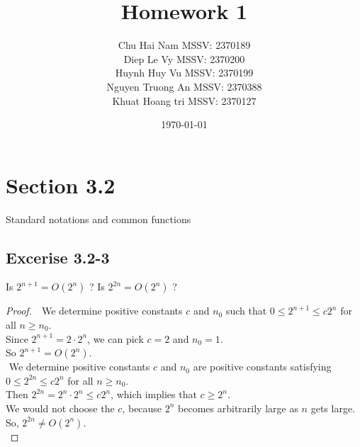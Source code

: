\documentclass{article}
\title{Homework 1}
\author{Chu Hai Nam MSSV: 2370189 \\
        Diep Le Vy MSSV: 2370200 \\
        Huynh Huy Vu MSSV: 2370199 \\
        Nguyen Truong An MSSV: 2370388\\
        Khuat Hoang tri MSSV: 2370127}
\date\today
\begin{document}
\maketitle %

\section*{Section 3.2}
Standard notations and common functions

\subsection*{Excerise 3.2-3}
Is $2^{n+1} = O(2^n)$ ? Is $2^{2n} = O(2^n)$ ?
\begin{proof}
    $ $\newline
    $ $\newline
    We determine positive constants $c$ and $n_0$ such that $0\le2^{n+1}\le c2^n$ for all $n\ge n_0$. \\
    Since $2^{n+1}=2\cdot2^n$, we can pick $c=2$ and $n_0=1$. \\
    So $2^{n+1}=O(2^n)$. \\
    $ $\newline
    We determine positive constants $c$ and $n_0$ are positive constants satisfying $0\le2^{2n}\le c2^n$ for all $n\ge n_0$. \\
    Then $2^{2n}=2^n\cdot2^n\le c2^n$, which implies that $c\ge2^n$. \\
    We would not choose the $c$, because $2^n$ becomes arbitrarily large as $n$ gets large. \\
    So, $2^{2n}\ne O(2^n)$. \\
\end{proof}

\newcommand{\Tworst}{T_{worst}(n)}
\newcommand{\Tbest}{T_{best}(n)}
\end{document}
